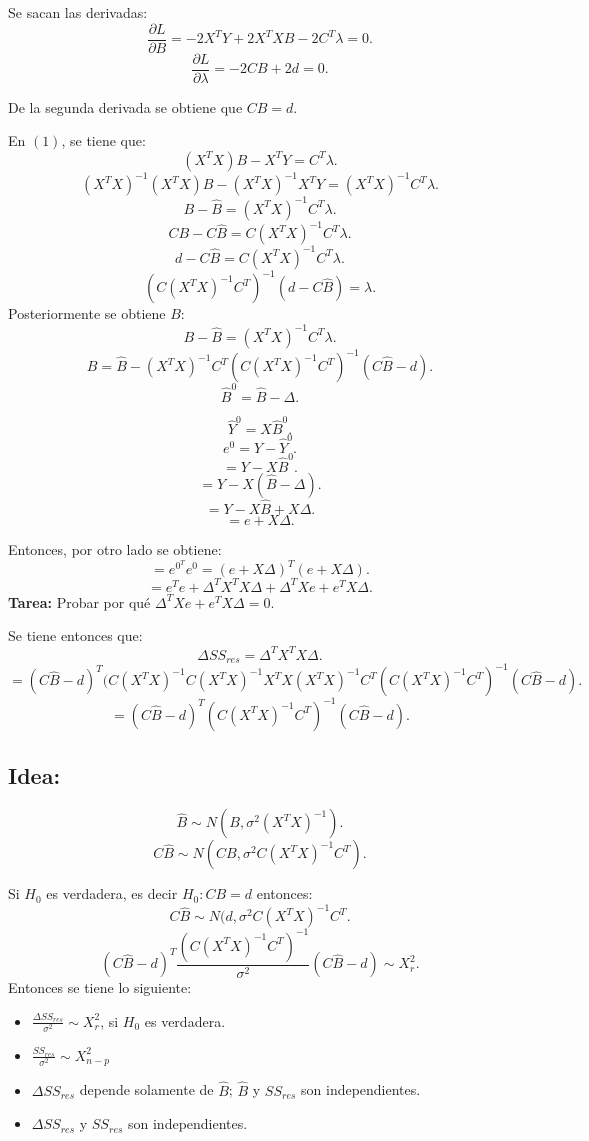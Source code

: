 \documentclass{article}
\begin{document}
Se sacan las derivadas:
\[ \frac{\partial L}{\partial B}=-2X^{T}Y+2X^{T}XB-2C^{T}\lambda =0 .\]
\[ \frac{\partial L}{\partial \lambda} =-2CB+2d=0.\]

De la segunda derivada se obtiene que $CB=d$.

En $(1)$, se tiene que:
\[ (X^{T}X)B-X^{T}Y=C^{T}\lambda .\]
\[ (X^{T}X)^{-1}(X^{T}X)B-(X^{T}X)^{-1}X^{T}Y=(X^{T}X)^{-1}C^{T}\lambda .\]
\[ B-\hat{B}=(X^{T}X)^{-1}C^{T}\lambda .\]
\[ CB-C\hat{B}=C(X^{T}X)^{-1}C^{T}\lambda .\]
\[ d-C\hat{B}=C(X^{T}X)^{-1}C^{T}\lambda .\]
\[ (C(X^{T}X)^{-1}C^{T})^{-1}(d-C\hat{B})=\lambda .\]
Posteriormente se obtiene $B$:
\[ B-\hat{B}=(X^{T}X)^{-1}C^{T}\lambda .\]
\[ B=\hat{B}-(X^{T}X)^{-1}C^{T}(C(X^{T}X)^{-1}C^{T})^{-1}(C\hat{B}-d) .\]
\[ \hat{B}^{0}=\hat{B}-\Delta .\]

\[ \hat{Y}^{0}=X\hat{B}^{0} .\]
\[ e^{0}=Y-\hat{Y}^{0} .\]
\[ =Y-X\hat{B}^{0} .\]
\[= Y-X(\hat{B}-\Delta) .\]
\[ =Y-X\hat{B}+X\Delta .\]
\[ =e+X\Delta .\]

Entonces, por otro lado se obtiene:
\[ =e^{0^{T}}e^{0}=(e+X\Delta)^{T}(e+X\Delta) .\]
\[ =e^{T}e + \Delta^{T}X^{T}X\Delta+\Delta^{T}Xe+e^{T}X\Delta .\]
\textbf{Tarea: }Probar por qué $\Delta^{T}Xe + e^{T}X\Delta=0$.

Se tiene entonces que:
\[ \Delta SS_{res}=\Delta^{T}X^{T}X\Delta .\]
\[ =(C\hat{B}-d)^{T}(C(X^{T}X)^{-1}C(X^{T}X)^{-1}X^{T}X(X^{T}X)^{-1}C^{T}(C(X^{T}X)^{-1}C^{T})^{-1}(C\hat{B}-d) .\]
\[ = (C\hat{B}-d)^{T}(C(X^{T}X)^{-1}C^{T})^{-1}(C\hat{B}-d).\]

\subsection{Idea:}
\[ \hat{B}\sim N(B,\sigma^{2}(X^{T}X)^{-1}) .\]
\[ C\hat{B} \sim N(CB,\sigma^{2}C(X^{T}X)^{-1}C^{T}) .\]

Si $H_{0}$ es verdadera, es decir $H_{0}: CB = d$ entonces:
\[ C\hat{B} \sim N(d,\sigma^{2}C(X^{T}X)^{-1}C^{T} .\]
\[ (C\hat{B}-d)^{T}\frac{(C(X^{T}X)^{-1}C^{T})^{-1}}{\sigma^{2}}(C\hat{B}-d) \sim X^{2}_{r}.\]
Entonces se tiene lo siguiente:
\begin{itemize}
	\item $\frac{\Delta SS_{res}}{\sigma^{2}} \sim X^{2}_{r}$, si $H_{0}$ es verdadera.
	\item $\frac{SS_{res}}{\sigma^{2}} \sim  X^{2}_{n-p}$
	\item $\Delta SS_{res}$ depende solamente de $\hat{B}$; $\hat{B}$ y $SS_{res}$ son independientes.
	\item $\Delta SS_{res}$ y $SS_{res}$ son independientes.
\end{itemize}
\end{document}

